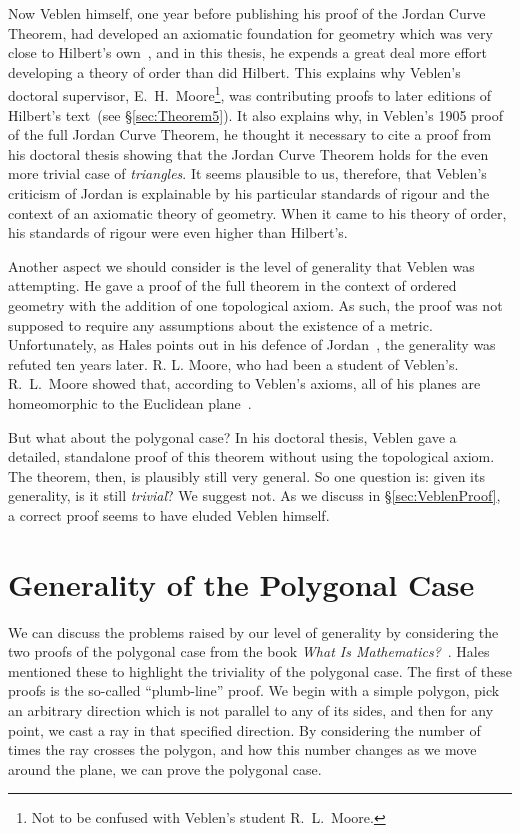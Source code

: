 Now Veblen himself, one year before publishing his proof of the Jordan Curve Theorem, had developed an axiomatic foundation for geometry which was very close to Hilbert's own~\cite{Veblenphd}, and in this thesis, he expends a great deal more effort developing a theory of order than did Hilbert. This explains why Veblen's doctoral supervisor, E.~H.~Moore\footnote{Not to be confused with Veblen's student R.~L.~Moore.}, was contributing proofs to later editions of Hilbert's text~(see \S\ref{sec:Theorem5}). It also explains why, in Veblen's 1905 proof of the full Jordan Curve Theorem, he thought it necessary to cite a proof from his doctoral thesis showing that the Jordan Curve Theorem holds for the even more trivial case of \emph{triangles}. It seems plausible to us, therefore, that Veblen's criticism of Jordan is explainable by his particular standards of rigour and the context of an axiomatic theory of geometry. When it came to his theory of order, his standards of rigour were even higher than Hilbert's.

Another aspect we should consider is the level of generality that Veblen was attempting. He gave a proof of the full theorem in the context of ordered geometry with the addition of one topological axiom. As such, the proof was not supposed to require any assumptions about the existence of a metric. Unfortunately, as Hales points out in his defence of Jordan~\cite{HalesJordansProof}, the generality was refuted ten years later. R. L. Moore, who had been a student of Veblen's. R.~L.~Moore showed that, according to Veblen's axioms, all of his planes are homeomorphic to the Euclidean plane~\cite{MooreSitus}. %

But what about the polygonal case? In his doctoral thesis, Veblen gave a detailed, standalone proof of this theorem without using the topological axiom. The theorem, then, is plausibly still very general. So one question is: given its generality, is it still \emph{trivial}? We suggest not. As we discuss in \S\ref{sec:VeblenProof}, a correct proof seems to have eluded Veblen himself.

\section{Generality of the Polygonal Case}\label{sec:JordanCurveGenerality}
We can discuss the problems raised by our level of generality by considering the two proofs of the polygonal case from the book \emph{What Is Mathematics?}~\cite{WhatIsMathematics}. Hales mentioned these to highlight the triviality of the polygonal case. The first of these proofs is the so-called ``plumb-line'' proof. We begin with a simple polygon, pick an arbitrary direction which is not parallel to any of its sides, and then for any point, we cast a ray in that specified direction. By considering the number of times the ray crosses the polygon, and how this number changes as we move around the plane, we can prove the polygonal case.

